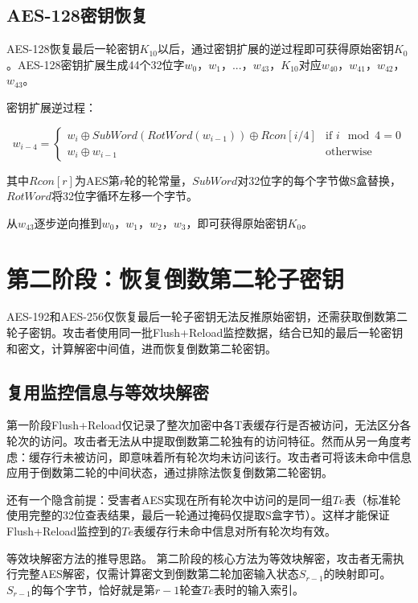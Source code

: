 \subsection{AES-128密钥恢复}

AES-128恢复最后一轮密钥$K_{10}$以后，通过密钥扩展的逆过程即可获得原始密钥$K_0$。AES-128密钥扩展生成44个32位字$w_0$，$w_1$，$...$，$w_{43}$，$K_{10}$对应$w_{40}$，$w_{41}$，$w_{42}$，$w_{43}$。

密钥扩展逆过程：

\begin{equation}
w_{i-4} = \begin{cases} w_i \oplus SubWord(RotWord(w_{i-1})) \oplus Rcon[i/4] & \text{if } i \mod 4 = 0 \\ w_i \oplus w_{i-1} & \text{otherwise} \end{cases}
\end{equation}

其中$Rcon[r]$为AES第$r$轮的轮常量，$SubWord$对32位字的每个字节做S盒替换，$RotWord$将32位字循环左移一个字节。

从$w_{43}$逐步逆向推到$w_0$，$w_1$，$w_2$，$w_3$，即可获得原始密钥$K_0$。

\section{第二阶段：恢复倒数第二轮子密钥}

AES-192和AES-256仅恢复最后一轮子密钥无法反推原始密钥，还需获取倒数第二轮子密钥。攻击者使用同一批Flush+Reload监控数据，结合已知的最后一轮密钥和密文，计算解密中间值，进而恢复倒数第二轮密钥。

\subsection{复用监控信息与等效块解密}

第一阶段Flush+Reload仅记录了整次加密中各T表缓存行是否被访问，无法区分各轮次的访问。攻击者无法从中提取倒数第二轮独有的访问特征。然而从另一角度考虑：缓存行未被访问，即意味着所有轮次均未访问该行。攻击者可将该未命中信息应用于倒数第二轮的中间状态，通过排除法恢复倒数第二轮密钥。

还有一个隐含前提：受害者AES实现在所有轮次中访问的是同一组$Te$表（标准轮使用完整的32位查表结果，最后一轮通过掩码仅提取S盒字节）。这样才能保证Flush+Reload监控到的$Te$表缓存行未命中信息对所有轮次均有效。

等效块解密方法的推导思路。
第二阶段的核心方法为等效块解密，攻击者无需执行完整AES解密，仅需计算密文到倒数第二轮加密输入状态$S_{r-1}$的映射即可。$S_{r-1}$的每个字节，恰好就是第$r-1$轮查$Te$表时的输入索引。

